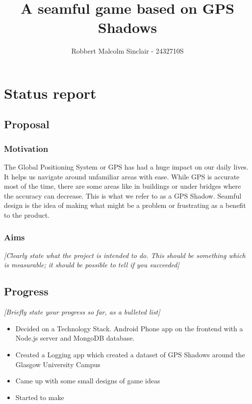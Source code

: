 \documentclass[11pt]{article}
\title{ A seamful game based on GPS Shadows }
\author{ Robbert Malcolm Sinclair - 2432710S }
\begin{document}
    \maketitle
    
    
     

\section{Status report}

\subsection{Proposal}\label{proposal}

\subsubsection{Motivation}\label{motivation}


The Global Positioning System or GPS has had a huge impact on our daily lives. It helps us navigate around unfamiliar areas with ease. While GPS is accurate most of the time, there
are some areas like in buildings or under bridges where the accuracy can decrease. This is what we refer to as a GPS Shadow. Seamful design is the idea of making what might be
a problem or frustrating as a benefit to the product. 


\subsubsection{Aims}\label{aims}

\emph{{[}Clearly state what the project is intended to do. This should
be something which is measurable; it should be possible to tell if you
succeeded{]}}

\subsection{Progress}\label{progress}

\emph{{[}Briefly state your progress so far, as a bulleted list{]}}

\begin{itemize}
    \tightlist
\item Decided on a Technology Stack. Android Phone app on the frontend with a Node.js server and MongoDB database. 
\item Created a Logging app which created a dataset of GPS Shadows around the Glasgow University Campus
\item Came up with some small designs of game ideas
\item Started to make 
\end{itemize}
\end{document}
